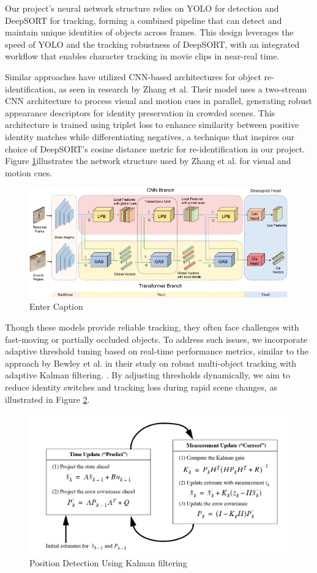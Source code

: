 \documentclass[twoside,english]{article}
\begin{document}
    Our project’s neural network structure relies on YOLO for detection and DeepSORT for tracking, forming a combined pipeline that can detect and maintain unique identities of objects across frames. This design leverages the speed of YOLO and the tracking robustness of DeepSORT, with an integrated workflow that enables character tracking in movie clips in near-real time. 

    Similar approaches have utilized CNN-based architectures for object re-identification, as seen in research by Zhang et al. \citep{paper_zhang}  Their model uses a two-stream CNN architecture to process visual and motion cues in parallel, generating robust appearance descriptors for identity preservation in crowded scenes. This architecture is trained using triplet loss to enhance similarity between positive identity matches while differentiating negatives, a technique that inspires our choice of DeepSORT’s cosine distance metric for re-identification in our project. Figure \ref{fig_zhong}illustrates the network structure used by Zhang et al. for visual and motion cues.
    
    \begin{figure}[!h]
        \centering
        \includegraphics[width=0.5\linewidth]{imgs/zhong.png}
        \caption{Enter Caption}
        \label{fig_zhong}
    \end{figure}
    
    Though these models provide reliable tracking, they often face challenges with fast-moving or partially occluded objects. To address such issues, we incorporate adaptive threshold tuning based on real-time performance metrics, similar to the approach by Bewley et al. in their study on robust multi-object tracking with adaptive Kalman filtering. \citep{paper_SORT}. By adjusting thresholds dynamically, we aim to reduce identity switches and tracking loss during rapid scene changes, as illustrated in Figure \ref{fig_kalman}.

    \begin{figure}
        \centering
        \includegraphics[width=0.5\linewidth]{imgs/Kalman.png}
        \caption{Position Detection Using Kalman filtering}
        \label{fig_kalman}
    \end{figure}
\end{document}
